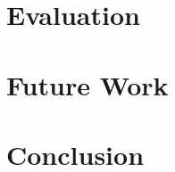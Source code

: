 \documentclass[a4paper, oneside]{book}
\begin{document}











\chapter{Evaluation}

\label{chapter:evaluation}








\chapter{Future Work}

\label{chapter:future-work}




\chapter{Conclusion}

\label{chapter:conclusion}




\backmatter


\clearpage

\pdfbookmark{\bibname}{\bibname}




\end{document}
